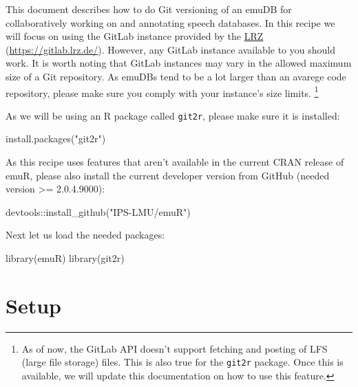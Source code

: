 \documentclass[
]{book}
\newenvironment{Shaded}{\begin{snugshade}}{\end{snugshade}}
\newcommand{\FunctionTok}[1]{\textcolor[rgb]{0.00,0.00,0.00}{#1}}
\newcommand{\NormalTok}[1]{#1}
\newcommand{\SpecialCharTok}[1]{\textcolor[rgb]{0.00,0.00,0.00}{#1}}
\newcommand{\StringTok}[1]{\textcolor[rgb]{0.31,0.60,0.02}{#1}}
\begin{document}
This document describes how to do Git versioning of an emuDB for collaboratively working on and annotating speech databases. In this recipe we will focus on using the GitLab instance provided by the \href{https://www.lrz.de/}{LRZ} (\url{https://gitlab.lrz.de/}). However, any GitLab instance available to you should work. It is worth noting that GitLab instances may vary in the allowed maximum size of a Git repository. As emuDBs tend to be a lot larger than an avarege code repository, please make sure you comply with your instance's size limits. \footnote{As of now, the GitLab API doesn't support fetching and posting of LFS (large file storage) files. This is also true for the \texttt{git2r} package. Once this is available, we will update this documentation on how to use this feature.}

As we will be using an R package called \texttt{git2r}, please make sure it is installed:

\begin{Shaded}
\begin{Highlighting}[]
\FunctionTok{install.packages}\NormalTok{(}\StringTok{"git2r"}\NormalTok{)}
\end{Highlighting}
\end{Shaded}

As this recipe uses features that aren't available in the current CRAN release of emuR, please also install the current developer version from GitHub (needed version \textgreater= 2.0.4.9000):

\begin{Shaded}
\begin{Highlighting}[]
\NormalTok{devtools}\SpecialCharTok{::}\FunctionTok{install\_github}\NormalTok{(}\StringTok{"IPS{-}LMU/emuR"}\NormalTok{)}
\end{Highlighting}
\end{Shaded}

Next let us load the needed packages:

\begin{Shaded}
\begin{Highlighting}[]
\FunctionTok{library}\NormalTok{(emuR)}
\FunctionTok{library}\NormalTok{(git2r)}
\end{Highlighting}
\end{Shaded}

\hypertarget{setup}{%
\section{Setup}\label{setup}}
\end{document}
